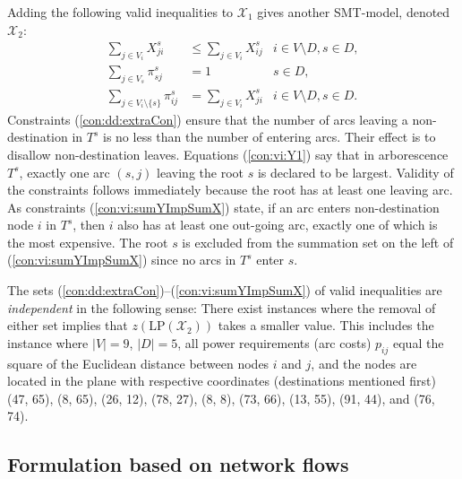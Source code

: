 Adding the following valid inequalities to $\mathcal{X}_1$ gives another SMT-model, denoted $\mathcal{X}_2$:
\begin{subequations}[resume]
\begin{align}
\label{con:dd:extraCon} \sum\limits_{j\in V_{i}}X^s_{ji} & \leq \sum\limits_{j\in V_{i}}X^s_{ij}  & 	i\in V\setminus D, s\in D,\\
\label{con:vi:Y1} \sum\limits_{j\in V_s}  \pi^{s}_{sj} & =1 & s\in D,\\
\label{con:vi:sumYImpSumX} \sum\limits_{j\in V_i\setminus\{s\} }\pi^{s}_{ij} & = \sum\limits_{j\in V_i}  X^{s}_{ji} & i\in V\setminus D, s\in D.
\end{align}
\end{subequations}
Constraints (\ref{con:dd:extraCon}) ensure that the number of arcs leaving a non-destination in $T^s$ is no less than the number of entering arcs.
Their effect is to disallow non-destination leaves.
Equations (\ref{con:vi:Y1}) say that in arborescence $T^s$, exactly one arc $(s,j)$ leaving the root $s$ is declared to be largest.
Validity of the constraints follows immediately because the root has at least one leaving arc.
As constraints (\ref{con:vi:sumYImpSumX}) state, if an arc enters non-destination node $i$ in $T^s$, then $i$ also has at least one out-going arc,
exactly one of which is the most expensive.
The root $s$ is excluded from the summation set on the left of (\ref{con:vi:sumYImpSumX}) since no arcs in $T^s$ enter $s$.

\begin{remark} \label{rem:x2}
The sets (\ref{con:dd:extraCon})--(\ref{con:vi:sumYImpSumX}) of valid inequalities are \emph{independent} in the following sense:
There exist instances where the removal of either set implies that $z(\text{LP}(\mathcal{X}_2))$ takes a smaller value.
This includes the instance where $|V|=9$, $|D|=5$, all power requirements (arc costs) $p_{ij}$ equal the square of the Euclidean distance between nodes $i$ and $j$,
and the nodes are located in the plane with respective coordinates (destinations mentioned first)
(47, 65), (8, 65), (26, 12), (78, 27), (8, 8), (73, 66), (13, 55), (91, 44), and (76, 74).
\end{remark}

\subsection{Formulation based on network flows}

